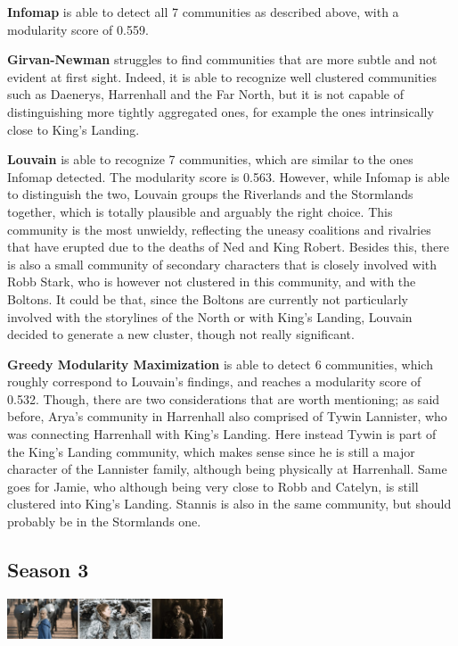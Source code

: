 \documentclass[10pt,twocolumn,letterpaper]{article}
\begin{document}
\textbf{Infomap} is able to detect all 7 communities as described above, with a modularity score of 0.559. 

\textbf{Girvan-Newman} struggles to find communities that are more subtle and not evident at first sight. Indeed, it is able to recognize well clustered communities such as Daenerys, Harrenhall and the Far North, but it is not capable of distinguishing more tightly aggregated ones, for example the ones intrinsically close to King's Landing.

\textbf{Louvain} is able to recognize 7 communities, which are similar to the ones Infomap detected. The modularity score is 0.563. However, while Infomap is able to distinguish the two, Louvain groups the Riverlands and the Stormlands together, which is totally plausible and arguably the right choice. This community is the most unwieldy, reflecting the uneasy coalitions and rivalries that have erupted due to the deaths of Ned and King Robert. 
Besides this, there is also a small community of secondary characters that is closely involved with Robb Stark, who is however not clustered in this community, and with the Boltons. It could be that, since the Boltons are currently not particularly involved with the storylines of the North or with King's Landing, Louvain decided to generate a new cluster, though not really significant.

\textbf{Greedy Modularity Maximization} is able to detect 6 communities, which roughly correspond to Louvain's findings, and reaches a modularity score of 0.532. Though, there are two considerations that are worth mentioning; as said before, Arya's community in Harrenhall also comprised of Tywin Lannister, who was connecting Harrenhall with King's Landing. Here instead Tywin is part of the King's Landing community, which makes sense since he is still a major character of the Lannister family, although being physically at Harrenhall. Same goes for Jamie, who although being very close to Robb and Catelyn, is still clustered into King's Landing. Stannis is also in the same community, but should probably be in the Stormlands one.

\subsection{Season 3}

\begin{center} 
    \includegraphics[width=0.48\textwidth]{img/s3/frames_s3.jpg}
\end{center}
\end{document}
